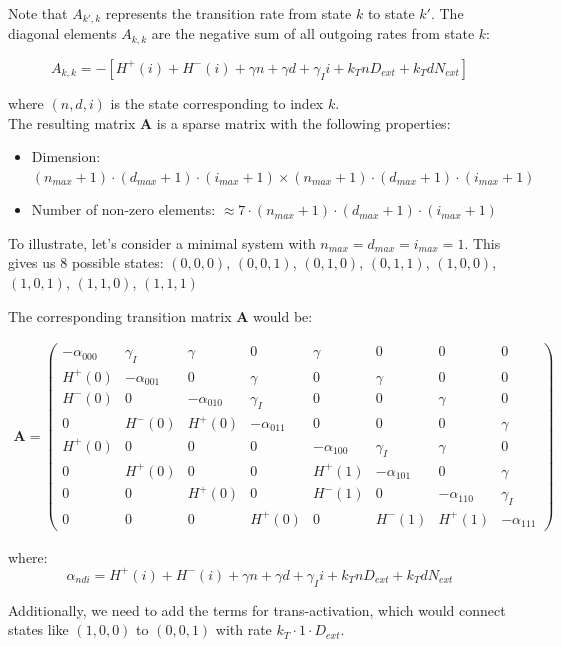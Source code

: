 \documentclass{article}
\begin{document}
\begin{flushleft}
Note that $A_{k',k}$ represents the transition rate from state $k$ to state $k'$. The diagonal elements $A_{k,k}$ are the negative sum of all outgoing rates from state $k$:

\[
A_{k,k} = -[H^+(i) + H^-(i) + \gamma n + \gamma d + \gamma_I i + k_T n D_{ext} + k_T d N_{ext}]
\]

where $(n,d,i)$ is the state corresponding to index $k$.\\

The resulting matrix $\mathbf{A}$ is a sparse matrix with the following properties:
\begin{itemize}
    \item Dimension: $(n_{max}+1) \cdot (d_{max}+1) \cdot (i_{max}+1) \times (n_{max}+1) \cdot (d_{max}+1) \cdot (i_{max}+1)$
    \item Number of non-zero elements: $\approx 7 \cdot (n_{max}+1) \cdot (d_{max}+1) \cdot (i_{max}+1)$
\end{itemize}

To illustrate, let's consider a minimal system with $n_{max} = d_{max} = i_{max} = 1$. This gives us 8 possible states:
$(0,0,0)$, $(0,0,1)$, $(0,1,0)$, $(0,1,1)$, $(1,0,0)$, $(1,0,1)$, $(1,1,0)$, $(1,1,1)$

The corresponding transition matrix $\mathbf{A}$ would be:

\begin{align*}
\mathbf{A} = 
\begin{pmatrix}
-\alpha_{000} & \gamma_I & \gamma & 0 & \gamma & 0 & 0 & 0 \\
H^+(0) & -\alpha_{001} & 0 & \gamma & 0 & \gamma & 0 & 0 \\
H^-(0) & 0 & -\alpha_{010} & \gamma_I & 0 & 0 & \gamma & 0 \\
0 & H^-(0) & H^+(0) & -\alpha_{011} & 0 & 0 & 0 & \gamma \\
H^+(0) & 0 & 0 & 0 & -\alpha_{100} & \gamma_I & \gamma & 0 \\
0 & H^+(0) & 0 & 0 & H^+(1) & -\alpha_{101} & 0 & \gamma \\
0 & 0 & H^+(0) & 0 & H^-(1) & 0 & -\alpha_{110} & \gamma_I \\
0 & 0 & 0 & H^+(0) & 0 & H^-(1) & H^+(1) & -\alpha_{111}
\end{pmatrix}
\end{align*}

where:
\[
\alpha_{ndi} = H^+(i) + H^-(i) + \gamma n + \gamma d + \gamma_I i + k_T n D_{ext} + k_T d N_{ext}
\]

Additionally, we need to add the terms for trans-activation, which would connect states like $(1,0,0)$ to $(0,0,1)$ with rate $k_T \cdot 1 \cdot D_{ext}$.\\


\end{flushleft}
\end{document}
